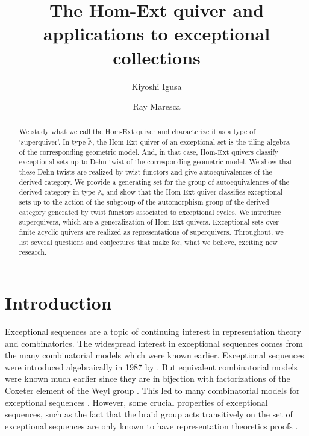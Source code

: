 \documentclass[12pt]{amsart}
\title{The Hom-Ext quiver and applications to exceptional collections}
\author{Kiyoshi Igusa}
\author{Ray Maresca}
\theoremstyle{plain}
\theoremstyle{definition}
\theoremstyle{remark}
\begin{document}
\begin{abstract}
We study what we call the Hom-Ext quiver and characterize it as a type of `superquiver'. In type $\tilde{\mathbb{A}}$, the Hom-Ext quiver of an exceptional set is the tiling algebra of the corresponding geometric model. And, in that case, Hom-Ext quivers classify exceptional sets up to Dehn twist of the corresponding geometric model. We show that these Dehn twists are realized by twist functors and give autoequivalences of the derived category. We provide a generating set for the group of autoequivalences of the derived category in type $\tilde{\mathbb{A}}$, and show that the Hom-Ext quiver classifies exceptional sets up to {\color{black} the action of the subgroup of the automorphism group of the derived category generated by twist functors associated to exceptional cycles.} We introduce superquivers, which are a generalization of Hom-Ext quivers. Exceptional sets over finite acyclic quivers are realized as representations of superquivers. Throughout, we list several questions and conjectures that make for, what we believe, exciting new research.
\end{abstract}

\maketitle

\tableofcontents

\section{Introduction}

{\color{black}
Exceptional sequences are a topic of continuing interest in representation theory and combinatorics. The widespread interest in exceptional sequences comes from the many combinatorial models which were known earlier. Exceptional sequences were introduced algebraically in 1987 by \cite{gorrud1987exceptional} \cite{rudakov1990exceptional}. But equivalent combinatorial models were known much earlier since they are in bijection with factorizations of the Coxeter element of the Weyl group \cite{hurwitz1891riemann} \cite{looijenga1974complement}. This led to many combinatorial models for exceptional sequences {\color{black}\cite{araya2013exceptional} \cite{garver2015combinatorial} \cite{garver2019combinatorics} \cite{maresca2022combinatorics} \cite{chang2023exceptional}}.   However, some crucial properties of exceptional sequences, such as the fact that the braid group acts transitively on the set of exceptional sequences are only known to have representation theoretics proofs \cite{crawley1992exceptional}\cite{ringel1994braid}.} 
\end{document}
